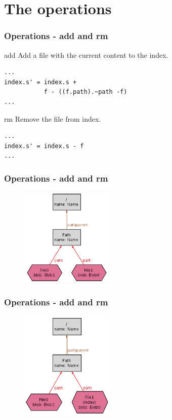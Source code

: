\documentclass{beamer}
\begin{document}
\section{The operations}
\begin{frame}[fragile]
   \frametitle{Operations - add and rm}
   \begin{block}{add}
      Add a file with the current content to the index.
   \end{block}
   \tiny
   \begin{lstlisting}
...
index.s' = index.s + 
           f - ((f.path).~path -f)
...   
   \end{lstlisting}
   \normalsize
   \begin{block}{rm}
      Remove the file from index.
   \end{block}
   \tiny
   \begin{lstlisting}
...
index.s' = index.s - f
...
   \end{lstlisting}
\end{frame}

\begin{frame}[fragile]
   \frametitle{Operations - add and rm}
   \begin{figure}
      \centering
      \includegraphics[width=0.4\textwidth]{images/add1.png}
   \end{figure}
\end{frame}

\begin{frame}[fragile]
   \frametitle{Operations - add and rm}
   \begin{figure}
      \centering
      \includegraphics[width=0.4\textwidth]{images/add2.png}
   \end{figure}
\end{frame}
\end{document}
